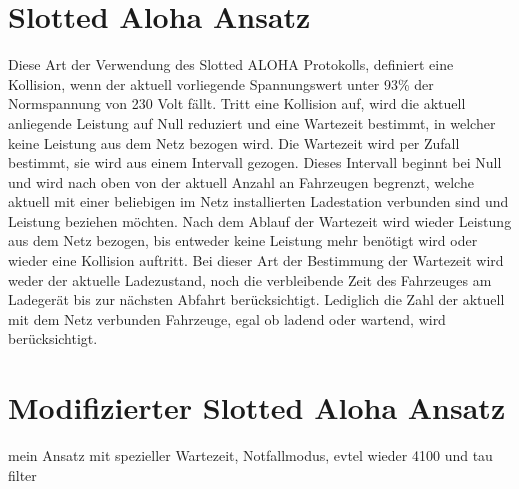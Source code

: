 \section{Slotted Aloha Ansatz}
\label{cap:background_sec:SA_participants}
Diese Art der Verwendung des Slotted ALOHA Protokolls, definiert eine Kollision, wenn der aktuell vorliegende Spannungswert unter 93\% der Normspannung von 230 Volt fällt. Tritt eine Kollision auf, wird die aktuell anliegende Leistung auf Null reduziert und eine Wartezeit bestimmt, in welcher keine Leistung aus dem Netz bezogen wird. Die Wartezeit wird per Zufall bestimmt, sie wird aus einem Intervall gezogen. Dieses Intervall beginnt  bei Null und wird nach oben von der aktuell Anzahl an Fahrzeugen begrenzt, welche aktuell mit einer beliebigen im Netz installierten Ladestation verbunden sind und Leistung beziehen möchten. Nach dem Ablauf der Wartezeit wird wieder Leistung aus dem Netz bezogen, bis entweder keine Leistung mehr benötigt wird oder wieder eine Kollision auftritt.
Bei dieser Art der Bestimmung der Wartezeit wird weder der aktuelle Ladezustand, noch die verbleibende Zeit des Fahrzeuges am Ladegerät bis zur nächsten Abfahrt berücksichtigt. Lediglich die Zahl der aktuell mit dem Netz verbunden Fahrzeuge, egal ob ladend oder wartend, wird berücksichtigt.

\section{Modifizierter Slotted Aloha Ansatz}
mein Ansatz mit spezieller Wartezeit, Notfallmodus, evtel wieder 4100 und tau filter

